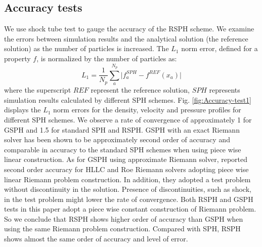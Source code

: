 \documentclass[review]{elsarticle}
\begin{document}
\subsection{Accuracy tests}
We use shock tube test to gauge the accuracy of the RSPH scheme.
We examine the errors between simulation results and the analytical solution (the reference solution) as the number of particles is increased. The $L_1$ norm error, defined for a property $f$, is normalized by the number of particles as:
\begin{equation}
L_1= \frac{1}{N_p} \sum_a^{N_p} \vert f_a^{SPH} - f^{REF} (x_a) \vert 
\end{equation}
where the superscript $REF$ represent the reference solution, $SPH$ represents simulation results calculated by different SPH schemes. Fig. \ref{fig:Accuracy-test1} displays the $L_1$ norm errors for the density, velocity and pressure profiles for different SPH schemes.
We observe a rate of convergence of approximately 1 for GSPH and 1.5 for standard SPH and RSPH.
GSPH with an exact Riemann solver has been shown to be approximately second order of accuracy \citep{puri2014comparison} and comparable in accuracy to the standard SPH schemes when using piece wise linear construction. As for GSPH using approximate Riemann solver, \citet{puri2014approximate} reported second order accuracy for HLLC and Roe Riemann solvers adopting piece wise linear Riemann problem construction. In addition, they adopted a test problem without discontinuity in the solution. Presence  of discontinuities, such as shock, in the test problem might lower the rate of convergence. Both RSPH and GSPH tests in this paper adopt a piece wise constant construction of Riemann problem. So we conclude that RSPH shows higher order of accuracy than GSPH when using the same Riemann problem construction. Compared with SPH, RSPH shows almost the same order of accuracy and level of error.
\end{document}
